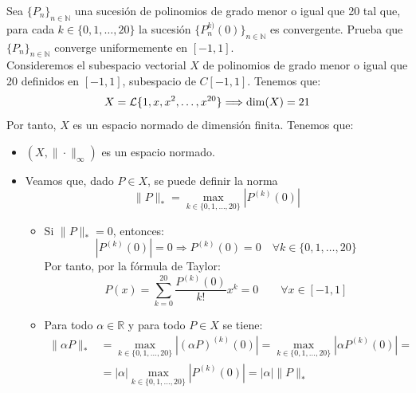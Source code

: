 \documentclass[12pt]{article}
\begin{document}
    \begin{ejercicio}[3 puntos]
        Sea $\{P_n\}_{n\in \mathbb{N}}$ una sucesión de polinomios de grado menor o igual que 20 tal que, para cada $k \in \{0,1,\ldots,20\}$ la sucesión $\{P_n^{k)}(0)\}_{n\in \mathbb{N}}$ es convergente. Prueba que $\{P_n\}_{n\in \mathbb{N}}$ converge uniformemente en $[-1,1]$.\\

        Consideremos el subespacio vectorial $X$ de polinomios de grado menor o igual que 20 definidos en $[-1,1]$, subespacio de $C[-1,1]$. Tenemos que:
        \begin{equation*}
            X=\mathcal{L}\{1,x,x^2,\ldots,x^{20}\}\Longrightarrow \dim(X)=21
        \end{equation*}
        Por tanto, $X$ es un espacio normado de dimensión finita. Tenemos que:
        \begin{itemize}
            \item $\left(X,\|\cdot\|_\infty\right)$ es un espacio normado.
            \item Veamos que, dado $P\in X$, se puede definir la norma
            \begin{equation*}
                \|P\|_* = \max_{k\in\{0,1,\ldots,20\}} |P^{(k)}(0)|
            \end{equation*}
            \begin{itemize}
                \item Si $\|P\|_*=0$, entonces:
                \begin{equation*}
                    |P^{(k)}(0)|=0 \Longrightarrow P^{(k)}(0)=0 \quad \forall k\in\{0,1,\ldots,20\}
                \end{equation*}
                Por tanto, por la fórmula de Taylor:
                \begin{equation*}
                    P(x) = \sum_{k=0}^{20} \frac{P^{(k)}(0)}{k!}x^k = 0\qquad \forall x\in[-1,1]
                \end{equation*}

                \item Para todo $\alpha\in\mathbb{R}$ y para todo $P\in X$ se tiene:
                \begin{align*}
                    \|\alpha P\|_* &= \max_{k\in\{0,1,\ldots,20\}} |(\alpha P)^{(k)}(0)| = \max_{k\in\{0,1,\ldots,20\}} |\alpha P^{(k)}(0)| =\\&= |\alpha| \max_{k\in\{0,1,\ldots,20\}} |P^{(k)}(0)| = |\alpha| \|P\|_*
                \end{align*}


\end{itemize}
\end{itemize}
\end{ejercicio}
\end{document}
